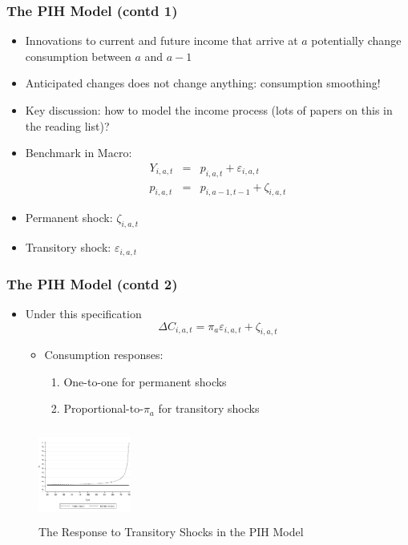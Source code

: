 \begin{frame}
	\frametitle{The PIH Model (contd 1)}
		\begin{itemize}
			\item Innovations to current and future income that arrive at $a$ potentially change consumption between $a$ and $a-1$
			\item Anticipated changes does not change anything: consumption smoothing!
			\item Key discussion: how to model the income process (lots of papers on this in the reading list)?
			\item Benchmark in Macro:
			\begin{eqnarray}
			Y_{i,a,t} &=& p_{i,a,t} + \varepsilon_{i,a,t} \nonumber \\
			p_{i,a,t} &=& p_{i,a-1,t-1} + \zeta_{i,a,t} \nonumber
			\end{eqnarray}
			\item Permanent shock: $\zeta_{i,a,t}$
			\item Transitory shock: $\varepsilon_{i,a,t}$
		\end{itemize}
\end{frame}

\begin{frame}
	\frametitle{The PIH Model (contd 2)}
		\begin{itemize}
			\item Under this specification
				\begin{equation}
					\Delta C_{i,a,t} = \pi_{a} \varepsilon_{i,a,t} + \zeta_{i,a,t} 
				\end{equation}
				\begin{itemize}
			\item Consumption responses:
					\begin{enumerate}
						\item One-to-one for permanent shocks
						\item Proportional-to-$\pi_{a}$ for transitory shocks
					\end{enumerate}
				\end{itemize}
		\end{itemize}
			
\begin{center}
\begin{figure}[H]
\caption*{The Response to Transitory Shocks in the PIH Model}
\centering
\includegraphics[width=1.2in, height=1.2in]{Figure1MP_2011.png}
\end{figure}
\end{center}		
		
\end{frame}

